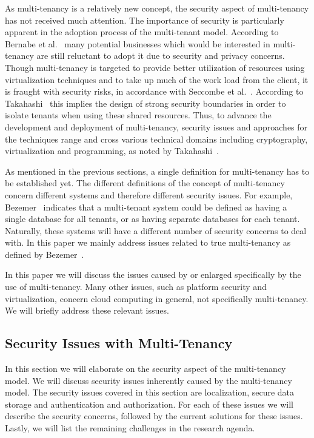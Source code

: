 As multi-tenancy is a relatively new concept, the security aspect of multi-tenancy has not received much attention. The importance of security is particularly apparent in the adoption process of the multi-tenant model. 
According to Bernabe et al.~\cite{Bernabe2012Auth} many potential businesses which would be interested in multi-tenancy are still reluctant to adopt it due to security and privacy concerns.
Though multi-tenancy is targeted to provide better utilization of resources using virtualization techniques and to take up much of the work load from the client, it is fraught with security risks, in accordance with Seccombe et al.~\cite{Seccombe2009Security}. 
According to Takahashi~\cite{Takahashi2012Security} this implies the design of strong security boundaries in order to isolate tenants when using these shared resources. 
Thus, to advance the development and deployment of multi-tenancy, security issues and approaches for the techniques range and cross various technical domains including cryptography, virtualization and programming, as noted by Takahashi~\cite{Takahashi2012Security}.

As mentioned in the previous sections, a single definition for multi-tenancy has to be established yet. 
The different definitions of the concept of multi-tenancy concern different systems and therefore different security issues.
For example, Bezemer~\cite{bezemer2010multi} indicates that a multi-tenant system could be defined as having a single database for all tenants, or as having separate databases for each tenant. 
Naturally, these systems will have a different number of security concerns to deal with. In this paper we mainly address issues related to true multi-tenancy as defined by Bezemer~\cite{bezemer2010multi}.

In this paper we will discuss the issues caused by or enlarged specifically by the use of multi-tenancy. 
Many other issues, such as platform security and virtualization, concern cloud computing in general, not specifically multi-tenancy. 
We will briefly address these relevant issues. 

\subsection{Security Issues with Multi-Tenancy}
In this section we will elaborate on the security aspect of the multi-tenancy model. 
We will discuss security issues inherently caused by the multi-tenancy model.
The security issues covered in this section are localization, secure data storage and authentication and authorization.
For each of these issues we will describe the security concerns, followed by the current solutions for these issues. 
Lastly, we will list the remaining challenges in the research agenda.

